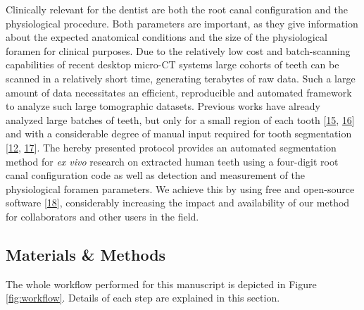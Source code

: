 \documentclass[
  american,
]{article}
\begin{document}
Clinically relevant for the dentist are both the root canal configuration and the physiological procedure.
Both parameters are important, as they give information about the expected anatomical conditions and the size of the physiological foramen for clinical purposes.
Due to the relatively low cost and batch-scanning capabilities of recent desktop micro-CT systems large cohorts of teeth can be scanned in a relatively short time, generating terabytes of raw data.
Such a large amount of data necessitates an efficient, reproducible and automated framework to analyze such large tomographic datasets.
Previous works have already analyzed large batches of teeth, but only for a small region of each tooth {[}\protect\hyperlink{ref-amSKhLb1}{15}, \protect\hyperlink{ref-DLVCfdzK}{16}{]} and with a considerable degree of manual input required for tooth segmentation {[}\protect\hyperlink{ref-OttTicsv}{12}, \protect\hyperlink{ref-ZTgDEakx}{17}{]}.
The hereby presented protocol provides an automated segmentation method for \emph{ex vivo} research on extracted human teeth using a four-digit root canal configuration code as well as detection and measurement of the physiological foramen parameters.
We achieve this by using free and open-source software {[}\protect\hyperlink{ref-11csWtgxP}{18}{]}, considerably increasing the impact and availability of our method for collaborators and other users in the field.

\hypertarget{materials-methods}{%
\subsection{Materials \& Methods}\label{materials-methods}}

The whole workflow performed for this manuscript is depicted in Figure \ref{fig:workflow}.
Details of each step are explained in this section.
\end{document}
